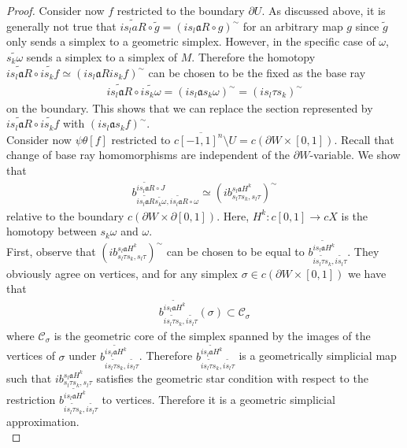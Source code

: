 \documentclass[a4paper,11pt]{article}
\theoremstyle{definition}
\theoremstyle{plain}
\theoremstyle{remark}
\begin{document}
{\begin{proof}
Consider now $f$ restricted to the boundary $\partial{U}$. As discussed above, it is generally not true that $\widetilde{i  s_{l}a R} \circ \widetilde{g} = (is_{l}\mathfrak{a}R\circ g)^{\sim}$ for an arbitrary map $g$ since $\widetilde{g}$ only sends a simplex to a geometric simplex. However, in the specific case of $\omega$, $\widetilde{s_{k}\omega}$ sends a simplex to a simplex of $M$. Therefore the homotopy $\widetilde{is_{l}\mathfrak{a}R}\circ \widetilde{is_{k}f} \simeq (is_{l}\mathfrak{a}R is_{k}f)^{\sim}$ can be chosen to be the fixed as the base ray 
\begin{align*}
\widetilde{is_{l}\mathfrak{a}R}\circ \widetilde{is_{k}\omega} = (is_{l} \mathfrak{a} s_{k}\omega)^{\sim} = (is_{l}\tau s_{k})^{\sim}
\end{align*} on the boundary. This shows that we can replace the section represented by $\widetilde{is_{l}\mathfrak{a}R} \circ \widetilde{is_{k}f}$ with $(is_{l} \mathfrak{a} s_{k}f)^{\sim}$. \\


 
Consider now  $\psi \theta[f]$ restricted to $c\overline{[-1,1]^n}\setminus U = c(\partial W \times [0,1])$. Recall that change of base ray homomorphisms are independent of the $\partial W$-variable. We show that 
\begin{align*}
 b^{\widetilde{i  s_{l}\mathfrak{a} R} \circ J}_{\widetilde{i  s_{l}\mathfrak{a} R} \widetilde{s_{k}\omega},\widetilde{i  s_{l}\mathfrak{a} R} \circ \omega} \simeq   (i b^{s_{l}\mathfrak{a}H^{k}}_{s_{l}\tau s_{k},s_{l}\tau})^{\sim}
\end{align*}
relative to the boundary $c(\partial W \times \partial[0,1])$. Here, $H^{k}: c[0,1]\rightarrow cX$ is the homotopy between $s_{k}\omega$ and $\omega$.\\


First, observe that $ (i b^{s_{l}\mathfrak{a}H^{k}}_{s_{l}\tau s_{k},s_{l}\tau})^{\sim}$ can be chosen to be equal to $b^{\widetilde{is_{l}\mathfrak{a}H^{k}}}_{\widetilde{is_{l}\tau s_{k}},\widetilde{is_{l}\tau}}$. They obviously agree on vertices, and for any simplex $\sigma \in c(\partial W \times [0,1])$ we have that 
\begin{align*}
b^{\widetilde{is_{l}\mathfrak{a}H^{k}}}_{\widetilde{is_{l}\tau s_{k}},\widetilde{is_{l}\tau}}(\sigma) \subset \mathscr{C}_{\sigma}
\end{align*}
where $\mathscr{C}_{\sigma}$ is the geometric core of the simplex spanned by the images of the vertices of $\sigma$ under $b^{\widetilde{is_{l}\mathfrak{a}H^{k}}}_{\widetilde{is_{l}\tau s_{k}},\widetilde{is_{l}\tau}}$. Therefore $b^{\widetilde{is_{l}\mathfrak{a} H^{k}}}_{\widetilde{is_{l}\tau s_{k}},\widetilde{is_{l}\tau}}$ is a geometrically simplicial map such that $i b^{s_{l}\mathfrak{a}H^{k}}_{s_{l}\tau s_{k},s_{l}\tau}$ satisfies the geometric star condition with respect to the restriction $b^{\widetilde{is_{l}\mathfrak{a}H^{k}}}_{\widetilde{is_{l}\tau s_{k}},\widetilde{is_{l}\tau}}$ to vertices. Therefore it is a geometric simplicial approximation.\\
 

\end{proof}}
\end{document}
